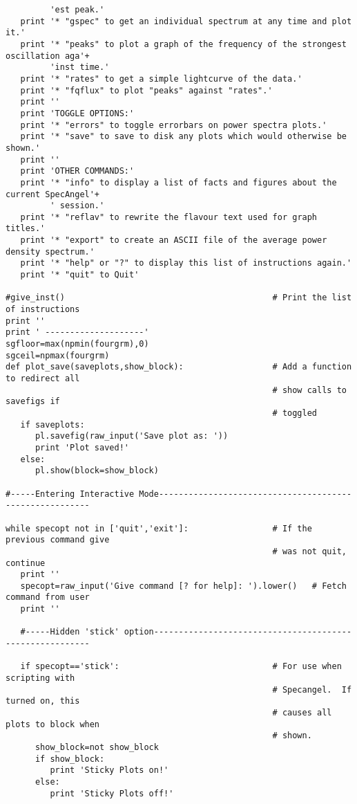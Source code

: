 \begin{verbatim}
         'est peak.'
   print '* "gspec" to get an individual spectrum at any time and plot it.'
   print '* "peaks" to plot a graph of the frequency of the strongest oscillation aga'+
         'inst time.'
   print '* "rates" to get a simple lightcurve of the data.'
   print '* "fqflux" to plot "peaks" against "rates".'
   print ''
   print 'TOGGLE OPTIONS:'
   print '* "errors" to toggle errorbars on power spectra plots.'
   print '* "save" to save to disk any plots which would otherwise be shown.'
   print ''
   print 'OTHER COMMANDS:'
   print '* "info" to display a list of facts and figures about the current SpecAngel'+
         ' session.'
   print '* "reflav" to rewrite the flavour text used for graph titles.'
   print '* "export" to create an ASCII file of the average power density spectrum.'
   print '* "help" or "?" to display this list of instructions again.'
   print '* "quit" to Quit'

#give_inst()                                          # Print the list of instructions
print ''
print ' --------------------'
sgfloor=max(npmin(fourgrm),0)
sgceil=npmax(fourgrm)
def plot_save(saveplots,show_block):                  # Add a function to redirect all
                                                      # show calls to savefigs if
                                                      # toggled
   if saveplots:
      pl.savefig(raw_input('Save plot as: '))
      print 'Plot saved!'
   else:
      pl.show(block=show_block)

#-----Entering Interactive Mode--------------------------------------------------------

while specopt not in ['quit','exit']:                 # If the previous command give
                                                      # was not quit, continue
   print ''
   specopt=raw_input('Give command [? for help]: ').lower()   # Fetch command from user
   print ''

   #-----Hidden 'stick' option---------------------------------------------------------

   if specopt=='stick':                               # For use when scripting with
                                                      # Specangel.  If turned on, this
                                                      # causes all plots to block when
                                                      # shown.
      show_block=not show_block
      if show_block:
         print 'Sticky Plots on!'
      else:
         print 'Sticky Plots off!'


\end{verbatim}
